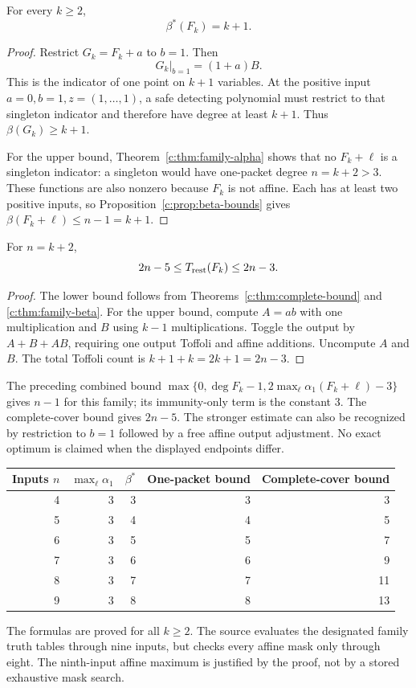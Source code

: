\begin{theorem}\label{c:thm:family-beta}
For every $k\ge2$,
\[
 \beta^*(F_k)=k+1.
\]
\end{theorem}
\begin{proof}
Restrict $G_k=F_k+a$ to $b=1$. Then
\[
 G_k|_{b=1}=(1+a)B.
\]
This is the indicator of one point on $k+1$ variables. At the positive input $a=0,b=1,z=(1,\ldots,1)$, a safe detecting polynomial must restrict to that singleton indicator and therefore have degree at least $k+1$. Thus $\beta(G_k)\ge k+1$.

For the upper bound, Theorem~\ref{c:thm:family-alpha} shows that no $F_k+\ell$ is a singleton indicator: a singleton would have one-packet degree $n=k+2>3$. These functions are also nonzero because $F_k$ is not affine. Each has at least two positive inputs, so Proposition~\ref{c:prop:beta-bounds} gives $\beta(F_k+\ell)\le n-1=k+1$.
\end{proof}

\begin{corollary}\label{c:cor:family-cost}
For $n=k+2$,
\[
 2n-5\le T_{\mathrm{rest}}(F_k)\le2n-3.
\]
\end{corollary}
\begin{proof}
The lower bound follows from Theorems~\ref{c:thm:complete-bound} and \ref{c:thm:family-beta}. For the upper bound, compute $A=ab$ with one multiplication and $B$ using $k-1$ multiplications. Toggle the output by $A+B+AB$, requiring one output Toffoli and affine additions. Uncompute $A$ and $B$. The total Toffoli count is $k+1+k=2k+1=2n-3$.
\end{proof}

The preceding combined bound $\max\{0,\deg F_k-1,2\max_{\ell}\alpha_1(F_k+\ell)-3\}$ gives $n-1$ for this family; its immunity-only term is the constant $3$. The complete-cover bound gives $2n-5$. The stronger estimate can also be recognized by restriction to $b=1$ followed by a free affine output adjustment. No exact optimum is claimed when the displayed endpoints differ.

\begin{center}
\begin{tabular}{@{}rrrrr@{}}
\toprule
Inputs $n$ & $\max_\ell\alpha_1$ & $\beta^*$ & One-packet bound & Complete-cover bound\\\midrule
4 & 3 & 3 & 3 & 3\\
5 & 3 & 4 & 4 & 5\\
6 & 3 & 5 & 5 & 7\\
7 & 3 & 6 & 6 & 9\\
8 & 3 & 7 & 7 & 11\\
9 & 3 & 8 & 8 & 13\\
\bottomrule
\end{tabular}
\end{center}
The formulas are proved for all $k\ge2$. The source evaluates the designated family truth tables through nine inputs, but checks every affine mask only through eight. The ninth-input affine maximum is justified by the proof, not by a stored exhaustive mask search.

